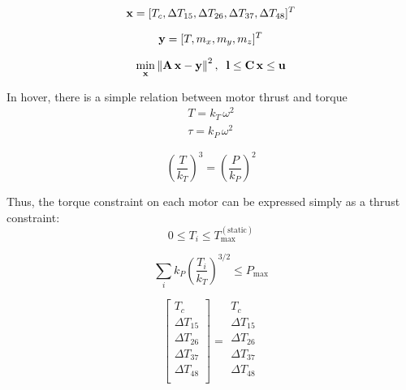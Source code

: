 \documentclass[11pt]{amsart}
\newcommand{\norm}[1]{\left\lVert#1\right\rVert}
\begin{document}
\begin{equation}
\bold{x} = [T_c, \Delta T_{15}, \Delta T_{26}, \Delta T_{37},
\Delta T_{48}]^T
\end{equation}

\begin{equation}
\bold{y} = [T, m_x, m_y, m_z]^T
\end{equation}

\begin{equation}
\min_{\bold{x}} \norm{\bold{A}\, \bold{x} - \bold{y}}^2,
\;\;\bold{l} \le \bold{C}\, \bold{x} \le \bold{u}
\end{equation}


In hover, there is a simple relation between motor thrust and torque
\begin{eqnarray}
T = k_T\, \omega^2 \\
\tau = k_P\, \omega^2
\end{eqnarray}

\begin{equation}
\left(\frac{T}{k_T}\right)^3 = \left(\frac{P}{k_P}\right)^2
\end{equation}

Thus, the torque constraint on each motor can be expressed simply as a
thrust constraint:
\begin{equation}
0 \le T_i \le T_{\mathrm{max}}^{\mathrm{(static)}}
\end{equation}

\begin{equation}
\sum_i k_P \left(\frac{T_i}{k_T}\right)^{3/2} \le P_{\mathrm{max}}
\end{equation}



\begin{equation}
\left[
\begin{array}{c}
T_c \\
\Delta T_{15} \\
\Delta T_{26} \\
\Delta T_{37} \\
\Delta T_{48} \\
\end{array}
\right]
=
\begin{array}{c}
T_c \\
\Delta T_{15} \\
\Delta T_{26} \\
\Delta T_{37} \\
\Delta T_{48} \\
\end{array}
\end{equation}
\end{document}
